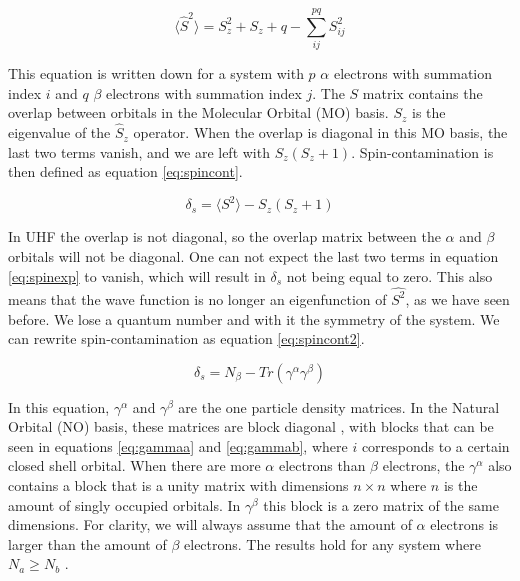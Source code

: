 \documentclass[twoside,twocolumn,9pt]{article}
\begin{document}
\begin{equation}\label{eq:spinexp}
  \langle \hat{S}^2 \rangle = S_z^2 + S_z + q - \sum_{ij}^{pq} S_{ij}^2
\end{equation}

This equation is written down for a system with $p$ $\alpha$ electrons with summation index $i$ and $q$ $\beta$ electrons with summation index $j$. The $S$ matrix contains the overlap
between orbitals in the Molecular Orbital (MO)
basis. $S_z$ is the eigenvalue of the $\hat{S}_z$ operator. When the overlap is diagonal in this MO basis, the last two terms vanish, and we are left with $S_z(S_z + 1)$.
Spin-contamination is then defined as equation \eqref{eq:spincont}.

\begin{equation}\label{eq:spincont}
  \delta_s = \langle S^2 \rangle - S_z(S_z + 1)
\end{equation}

In UHF the overlap is not diagonal, so the overlap matrix between the $\alpha$ and $\beta$ orbitals will not be diagonal. One can not
expect the last two terms in equation \eqref{eq:spinexp} to vanish, which will result in $\delta_s$ not being equal to zero. This also means that the wave function is no longer an
eigenfunction of $\hat{S^2}$, as we have seen before. We lose a quantum number and with it the symmetry of the system. We can rewrite spin-contamination as equation
\eqref{eq:spincont2}\cite{Savin2010}.

\begin{equation}\label{eq:spincont2}
  \delta_s = N_\beta - Tr(\gamma^\alpha\gamma^\beta)
\end{equation}

In this equation, $\gamma^{\alpha}$ and $\gamma^\beta$ are the one particle density matrices. In the Natural Orbital (NO) basis, these matrices are block diagonal
\cite{Scuseria2010}, with blocks that can be seen in equations \eqref{eq:gammaa} and \eqref{eq:gammab}, where $i$ corresponds to a certain closed shell orbital. When there are more
$\alpha$ electrons than $\beta$ electrons,
the $\gamma^\alpha$ also contains a block that is a unity matrix with dimensions $n\times n$ where $n$ is the amount of singly occupied orbitals. In $\gamma^\beta$ this block is a
zero matrix of the same dimensions. For clarity, we will always assume that the amount of $\alpha$ electrons is larger than the amount of $\beta$ electrons. The results hold for any system
where $N_a \geq N_b $ \cite{Scuseria2010}.
\end{document}

